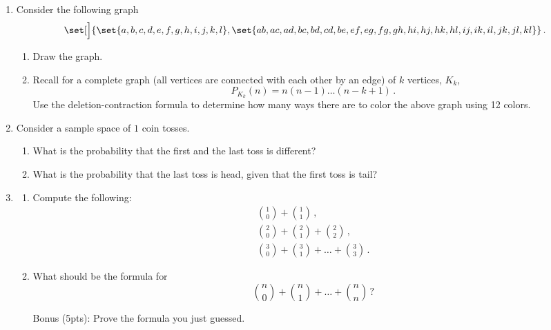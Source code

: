 \documentclass[12pt]{amsart}
\begin{document}
\begin{enumerate}[label=\arabic*.,itemsep=10pt, leftmargin=*]
    \item
    Consider the following graph
   \begin{equation*}
       \set[\Big]{\set{a,b,c,d,e,f,g,h,i,j,k,l}, \set{ab,ac,ad,bc,bd,cd,be,ef,eg,fg,gh,hi,hj,hk,hl,ij,ik,il,jk,jl,kl}}\,.
   \end{equation*}
   \begin{enumerate}
    \item Draw the graph. 
    \item Recall for a complete graph (all vertices are connected with each other by an edge) of $k$ vertices, $K_k$, $$P_{K_k}(n) = n(n-1)\dots(n-k+1)\,.$$ 
    Use the deletion-contraction formula to determine how many ways there are to color the above graph using 12 colors.
    \end{enumerate}
    \item 
        Consider a sample space of $1$ coin tosses.
        \begin{enumerate}
            \item What is the probability that the first and the last toss is different?
            \item What is the probability that the last toss is head, given that the
                first toss is tail?
        \end{enumerate}


    \item 
        \begin{enumerate}
            \item Compute the following:
                \begin{gather*}
                    \binom{1}{0} + \binom{1}{1} \,, \\
                    \binom{2}{0} + \binom{2}{1} + \binom{2}{2} \,, \\
                    \binom{3}{0} + \binom{3}{1} + \dots + \binom{3}{3} \,.
                \end{gather*}
    \item
        What should be the formula for 
        \begin{equation*}
            \binom{n}{0} + \binom{n}{1} + \dots + \binom{n}{n} \,?
        \end{equation*}

    \item[Bonus (5pts):] Prove the formula you just guessed.
        \end{enumerate}


\end{enumerate}
\end{document}
